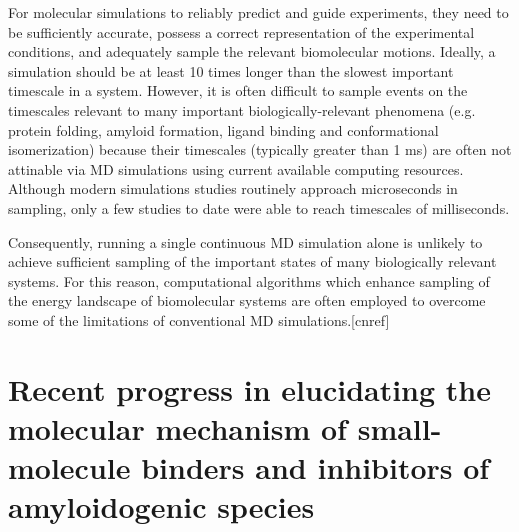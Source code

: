 For molecular simulations to reliably predict and guide experiments, they need to be sufficiently accurate,  possess a correct representation of the experimental conditions, and adequately sample the relevant biomolecular motions.\cite{Mobley:2011ks} Ideally, a simulation should be at least 10 times longer than the slowest important timescale in a system.\cite{Zuckerman:2011dz} However, it is often difficult to sample events on the timescales relevant to many important biologically-relevant phenomena (e.g. protein folding, amyloid formation, ligand binding and conformational isomerization) because their timescales (typically greater than 1 ms) are often not attinable via MD simulations using current available computing resources.  Although modern simulations studies routinely approach microseconds in sampling, only a few studies to date were able to reach timescales of milliseconds.\cite{Dror:2012cs,Shan:2011bo,LindorffLarsen:2011gl}

Consequently, running a single continuous MD simulation alone is unlikely to achieve sufficient sampling of the important states of many biologically relevant systems. For this reason, computational algorithms which enhance sampling of the energy landscape of biomolecular systems are often employed to overcome some of the limitations of conventional MD simulations.[cnref]



\section{Recent progress in elucidating the molecular mechanism of small-molecule binders and inhibitors of amyloidogenic species}


